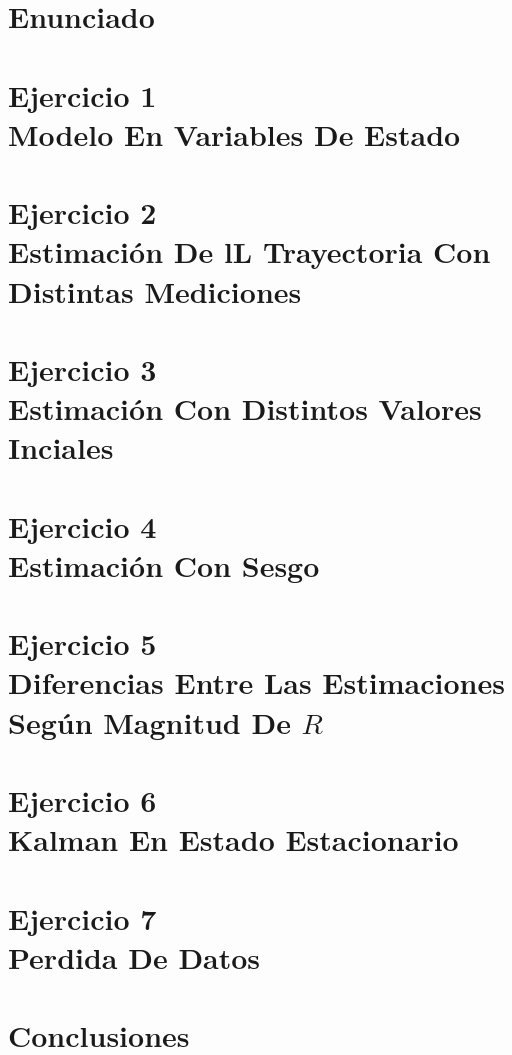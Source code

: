 \documentclass[10pt,a4paper]{article}
\begin{document}
		
	\setcounter{page}{1}

	\section{Enunciado}
		

	\section{Ejercicio 1 \\ Modelo En Variables De Estado}\label{sec:ej1}
		
		
	\section{Ejercicio 2 \\ Estimación De lL Trayectoria Con Distintas Mediciones}\label{sec:ej2}
		

	\section{Ejercicio 3 \\ Estimación Con Distintos Valores Inciales}\label{sec:ej3}
		

	\section{Ejercicio 4 \\ Estimación Con Sesgo}\label{sec:ej4}
		

	\section{Ejercicio 5 \\ Diferencias Entre Las Estimaciones Según Magnitud De $R$}\label{sec:ej5}
		

	\section{Ejercicio 6 \\ Kalman En Estado Estacionario}\label{sec:ej6}
		

	\section{Ejercicio 7 \\ Perdida De Datos}\label{sec:ej7}
		

	\section{Conclusiones}\label{sec:conclusiones}
		

\end{document}
